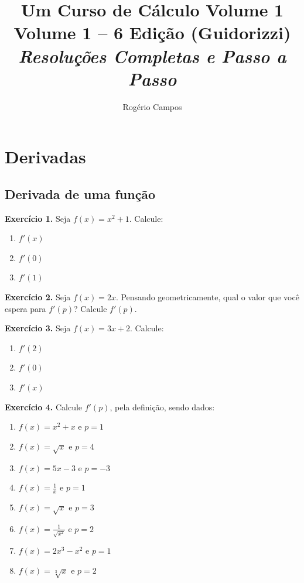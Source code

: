 \documentclass[12pt,a4paper]{article}
\title{
    \Huge \textbf{Um Curso de Cálculo Volume 1} \\
    \vspace{0.3cm}
    \Large Volume 1 -- 6\textordfeminine{} Edição (Guidorizzi) \\
    \vspace{0.5cm}
    \large \textit{Resoluções Completas e Passo a Passo}
}
\author{Rogério Campos}
\begin{document}
\maketitle
\newpage

\tableofcontents
\newpage

\setcounter{section}{6}

\section{Derivadas}
\setcounter{subsection}{1}
\subsection{Derivada de uma função}

\vspace{0.5cm}
\noindent\textbf{Exercício 1.} Seja $f(x) = x^2 + 1$. Calcule:

\begin{enumerate}
    \renewcommand{\theenumi}{\alph{enumi}}
    \renewcommand{\labelenumi}{\theenumi)}
    \item $f'(x)$
    \item $f'(0)$
    \item $f'(1)$
\end{enumerate}

\vspace{0.8cm} %
\noindent\textbf{Exercício 2.} Seja $f(x) = 2x$. Pensando geometricamente, qual o valor que você espera para $f'(p)$? Calcule $f'(p)$.

\vspace{0.8cm}
\noindent\textbf{Exercício 3.} Seja $f(x) = 3x + 2$. Calcule:

\begin{enumerate}
    \renewcommand{\theenumi}{\alph{enumi}}
    \renewcommand{\labelenumi}{\theenumi)}
    \item $f'(2)$
    \item $f'(0)$
    \item $f'(x)$
\end{enumerate}

\vspace{0.8cm}
\noindent\textbf{Exercício 4.} Calcule $f'(p)$, pela definição, sendo dados:

\begin{enumerate}
    \renewcommand{\theenumi}{\alph{enumi}}
    \renewcommand{\labelenumi}{\theenumi)}
    \item $f(x) = x^2 + x$ e $p = 1$
    \item $f(x) = \sqrt{x}$ e $p = 4$
    \item $f(x) = 5x - 3$ e $p = -3$
    \item $f(x) = \frac{1}{x}$ e $p = 1$
    \item $f(x) = \sqrt{x}$ e $p = 3$
    \item $f(x) = \frac{1}{\sqrt{x^2}}$ e $p = 2$
    \item $f(x) = 2x^3 - x^2$ e $p = 1$
    \item $f(x) = \sqrt[3]{x}$ e $p = 2$
\end{enumerate}
\end{document}
